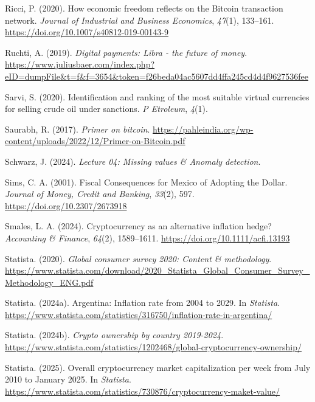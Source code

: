 \documentclass[
]{article}
\newlength{\cslhangindent}
\newenvironment{CSLReferences}[2] %
 {\begin{list}{}{%
  \setlength{\itemindent}{0pt}
  \setlength{\leftmargin}{0pt}
  \setlength{\parsep}{0pt}
  \ifodd #1
   \setlength{\leftmargin}{\cslhangindent}
   \setlength{\itemindent}{-1\cslhangindent}
  \fi
  \setlength{\itemsep}{#2\baselineskip}}}
 {\end{list}}
\begin{document}
\begin{CSLReferences}{1}{0}
Ricci, P. (2020). How economic freedom reflects on the Bitcoin transaction network. \emph{Journal of Industrial and Business Economics}, \emph{47}(1), 133--161. \url{https://doi.org/10.1007/s40812-019-00143-9}

Ruchti, A. (2019). \emph{Digital payments: Libra - the future of money}. \url{https://www.juliusbaer.com/index.php?eID=dumpFile&t=f&f=3654&token=f26beda04ac5607dd4ffa245cd4d4f9627536fee}

Sarvi, S. (2020). Identification and ranking of the most suitable virtual currencies for selling crude oil under sanctions. \emph{P Etroleum}, \emph{4}(1).

Saurabh, R. (2017). \emph{Primer on bitcoin}. \url{https://pahleindia.org/wp-content/uploads/2022/12/Primer-on-Bitcoin.pdf}

Schwarz, J. (2024). \emph{Lecture 04: Missing values \& Anomaly detection}.

Sims, C. A. (2001). Fiscal Consequences for Mexico of Adopting the Dollar. \emph{Journal of Money, Credit and Banking}, \emph{33}(2), 597. \url{https://doi.org/10.2307/2673918}

Smales, L. A. (2024). Cryptocurrency as an alternative inflation hedge? \emph{Accounting \& Finance}, \emph{64}(2), 1589--1611. \url{https://doi.org/10.1111/acfi.13193}

Statista. (2020). \emph{Global consumer survey 2020: Content \& methodology}. \url{https://www.statista.com/download/2020_Statista_Global_Consumer_Survey_Methodology_ENG.pdf}

Statista. (2024a). Argentina: Inflation rate from 2004 to 2029. In \emph{Statista}. \url{https://www.statista.com/statistics/316750/inflation-rate-in-argentina/}

Statista. (2024b). \emph{Crypto ownership by country 2019-2024}. \url{https://www.statista.com/statistics/1202468/global-cryptocurrency-ownership/}

Statista. (2025). Overall cryptocurrency market capitalization per week from July 2010 to January 2025. In \emph{Statista}. \url{https://www.statista.com/statistics/730876/cryptocurrency-maket-value/}


\end{CSLReferences}
\end{document}
